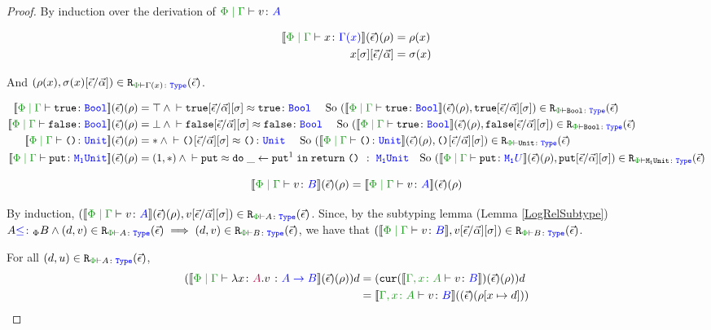 \documentclass{Report}
\begin{document}
\begin{proof}
    By induction over the derivation of $\gpetyperelation{v}{A}$

    \begin{align*}
        \deno{\gpetyperelation{x}{\G(x)}}\fundRho & = \rho(x) \\
        x\ssi\ssub{\av}{\ev} & = \si(x)\\
    \end{align*}

    And $\inLogRelPE{\rho(x)}{\si(x)\ssub{\av}{\ev}}{\G(x)}$.

    \begin{align*}
        \deno{\gpetyperelation{\t}{\B}}\fundRho & = \top \wedge \zberelation{\t\fundSub}{\t}{\B} \qt{ So } \inLogRelPE{\deno{\gpetyperelation{\t}{\B}}\fundRho}{\t\fundSub}{\B}\\
        \deno{\gpetyperelation{\f}{\B}}\fundRho & = \bot \wedge \zberelation{\f\fundSub}{\f}{\B} \qt{ So } \inLogRelPE{\deno{\gpetyperelation{\t}{\B}}\fundRho}{\f\fundSub}{\B}\\
        \deno{\gpetyperelation{\u}{\U}}\fundRho & = \singleton \wedge \zberelation{\u\fundSub}{\u}{\U} \qt{ So } \inLogRelPE{\deno{\gpetyperelation{\u}{\U}}\fundRho}{\u\fundSub}{\U}\\
        \deno{\gpetyperelation{\put}{\M{1}{\U}}}\fundRho & = (1, \singleton)\wedge \zberelation{\put}{\doin{\_}{\put^1}{\return{\u}}}{\s\M{\1}{\U}}\qt{So }\inLogRelPE{\deno{\gpetyperelation{\put}{\M{\1}{U}}}\fundRho}{\put\fundSub}{\M{\1}{\U}}\\ 
    \end{align*}


    \case{\vsubtype}

    \begin{equation}
        \deno{\gpetyperelation{v}{B}}\fundRho = \deno{\gpetyperelation{v}{A}}\fundRho
    \end{equation}

    By induction, $\inLogRelPE{\deno{\gpetyperelation{v}{A}}\fundRho}{v\fundSub}{A}$.
    Since, by the subtyping lemma (Lemma \ref{LogRelSubtype}) $A\subtypep B \wedge \inLogRelPE{d}{v}{A} \implies \inLogRelPE{d}{v}{B}$, we have that $\inLogRelPE{\deno{\gpetyperelation{v}{B}}}{v\fundSub}{B}$.

    \case{\vfun}

    For all $\inLogRelPE{d}{u}{A}$, 
    \begin{align*}
        (\deno{\gpetyperelation{\lam{x}{A}{v}}{\ab}}\fundRho) d & = (\cur{\deno{\typerelation{\gax}{v}{B}}}\fundRho) d\\
        & = \deno{\typerelation{\gax}{v}{B}} (\fundRhoExt{[x\mapsto d]})\\
    \end{align*}


\end{proof}
\end{document}
